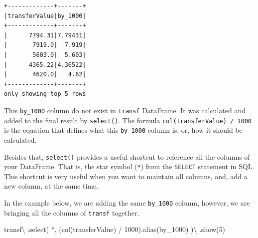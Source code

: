 \documentclass[
  11pt,
  letterpaper,
  DIV=11,
  numbers=noendperiod]{scrreprt}
\newenvironment{Shaded}{\begin{snugshade}}{\end{snugshade}}
\newcommand{\DecValTok}[1]{\textcolor[rgb]{0.68,0.00,0.00}{#1}}
\newcommand{\NormalTok}[1]{\textcolor[rgb]{0.00,0.23,0.31}{#1}}
\newcommand{\OperatorTok}[1]{\textcolor[rgb]{0.37,0.37,0.37}{#1}}
\newcommand{\StringTok}[1]{\textcolor[rgb]{0.13,0.47,0.30}{#1}}
\begin{document}
\begin{verbatim}
+-------------+-------+
|transferValue|by_1000|
+-------------+-------+
|      7794.31|7.79431|
|       7919.0|  7.919|
|       5603.0|  5.603|
|      4365.22|4.36522|
|       4620.0|   4.62|
+-------------+-------+
only showing top 5 rows
\end{verbatim}

This \texttt{by\_1000} column do not exist in \texttt{transf} DataFrame.
It was calculated and added to the final result by \texttt{select()}.
The formula
\texttt{col(\textquotesingle{}transferValue\textquotesingle{})\ /\ 1000}
is the equation that defines what this \texttt{by\_1000} column is, or,
how it should be calculated.

Besides that, \texttt{select()} provides a useful shortcut to reference
all the columns of your DataFrame. That is, the star symbol (\texttt{*})
from the \texttt{SELECT} statement in SQL. This shortcut is very useful
when you want to maintain all columns, and, add a new column, at the
same time.

In the example below, we are adding the same \texttt{by\_1000} column,
however, we are bringing all the columns of \texttt{transf} together.

\begin{Shaded}
\begin{Highlighting}[]
\NormalTok{transf}\OperatorTok{\textbackslash{}}
\NormalTok{  .select(}
    \StringTok{\textquotesingle{}*\textquotesingle{}}\NormalTok{,}
\NormalTok{    (col(}\StringTok{\textquotesingle{}transferValue\textquotesingle{}}\NormalTok{) }\OperatorTok{/} \DecValTok{1000}\NormalTok{).alias(}\StringTok{\textquotesingle{}by\_1000\textquotesingle{}}\NormalTok{)}
\NormalTok{  )}\OperatorTok{\textbackslash{}}
\NormalTok{  .show(}\DecValTok{5}\NormalTok{)}
\end{Highlighting}
\end{Shaded}
\end{document}
